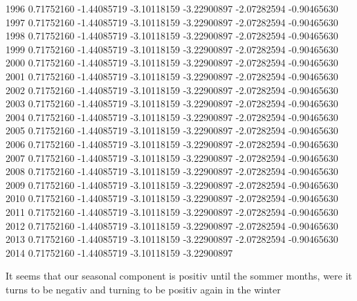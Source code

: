 \documentclass[11pt, a4paper]{article} %
\begin{document}
\begin{Schunk}
\begin{Soutput}
1996  0.71752160 -1.44085719 -3.10118159 -3.22900897 -2.07282594 -0.90465630
1997  0.71752160 -1.44085719 -3.10118159 -3.22900897 -2.07282594 -0.90465630
1998  0.71752160 -1.44085719 -3.10118159 -3.22900897 -2.07282594 -0.90465630
1999  0.71752160 -1.44085719 -3.10118159 -3.22900897 -2.07282594 -0.90465630
2000  0.71752160 -1.44085719 -3.10118159 -3.22900897 -2.07282594 -0.90465630
2001  0.71752160 -1.44085719 -3.10118159 -3.22900897 -2.07282594 -0.90465630
2002  0.71752160 -1.44085719 -3.10118159 -3.22900897 -2.07282594 -0.90465630
2003  0.71752160 -1.44085719 -3.10118159 -3.22900897 -2.07282594 -0.90465630
2004  0.71752160 -1.44085719 -3.10118159 -3.22900897 -2.07282594 -0.90465630
2005  0.71752160 -1.44085719 -3.10118159 -3.22900897 -2.07282594 -0.90465630
2006  0.71752160 -1.44085719 -3.10118159 -3.22900897 -2.07282594 -0.90465630
2007  0.71752160 -1.44085719 -3.10118159 -3.22900897 -2.07282594 -0.90465630
2008  0.71752160 -1.44085719 -3.10118159 -3.22900897 -2.07282594 -0.90465630
2009  0.71752160 -1.44085719 -3.10118159 -3.22900897 -2.07282594 -0.90465630
2010  0.71752160 -1.44085719 -3.10118159 -3.22900897 -2.07282594 -0.90465630
2011  0.71752160 -1.44085719 -3.10118159 -3.22900897 -2.07282594 -0.90465630
2012  0.71752160 -1.44085719 -3.10118159 -3.22900897 -2.07282594 -0.90465630
2013  0.71752160 -1.44085719 -3.10118159 -3.22900897 -2.07282594 -0.90465630
2014  0.71752160 -1.44085719 -3.10118159 -3.22900897                        
\end{Soutput}
\end{Schunk}

It seems that our seasonal component is positiv until the sommer months, were it turns to be negativ and turning to be positiv again in the winter
\end{document}
